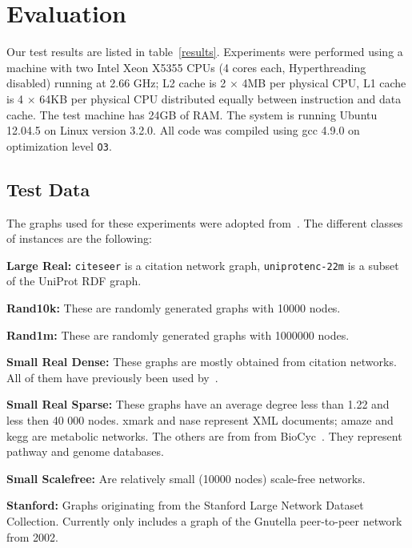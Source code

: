 \documentclass[12pt,a4paper,twoside]{article}
\begin{document}
\section{Evaluation}

Our test results are listed in table~\ref{results}. Experiments were performed using a machine with two Intel Xeon X5355 CPUs (4 cores each, Hyperthreading disabled) running at 2.66 GHz; L2 cache is 2 $\times$ 4MB per physical CPU, L1 cache is 4 $\times$ 64KB per physical CPU distributed equally between instruction and data cache. The test machine has 24GB of RAM.
The system is running Ubuntu 12.04.5 on Linux version 3.2.0. All code was compiled using gcc 4.9.0 on optimization level \texttt{O3}.



\subsection{Test Data}

The graphs used for these experiments were adopted from~\cite{preach}. The different classes of instances are the following:
\begin{description}
  \item{\textbf{Large Real:}} \verb|citeseer| is a citation network graph, \verb|uniprotenc-22m| is a subset of the UniProt RDF graph.
  \item{\textbf{Rand10k:}} These are randomly generated graphs with 10000 nodes.
  \item{\textbf{Rand1m:}} These are randomly generated graphs with 1000000 nodes.
  \item{\textbf{Small Real Dense:}} These graphs are mostly obtained from citation networks. All of them have previously been used by~\cite{Jin:2009:HIS:1559845.1559930}.
  \item{\textbf{Small Real Sparse:}} These graphs have an average degree less than 1.22 and less then
    40 000 nodes. xmark and nase represent XML documents; amaze and kegg are metabolic
    networks. The others are from from BioCyc~\cite{grail}. They represent pathway and genome
    databases.
  \item{\textbf{Small Scalefree:}} Are relatively small (10000 nodes) scale-free networks.
  \item{\textbf{Stanford:}} Graphs originating from the Stanford Large Network Dataset Collection. Currently only includes a graph of the Gnutella peer-to-peer network from 2002.
\end{description}
\end{document}
